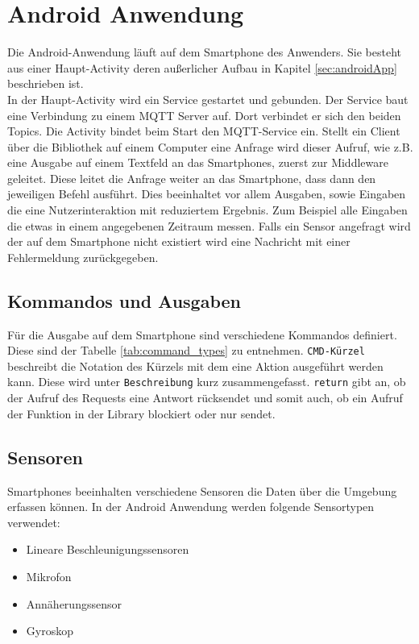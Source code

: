 \documentclass[11pt,a4paper]{report}
\begin{document}
\chapter{Android Anwendung}\label{chap:app}
Die Android-Anwendung läuft auf dem Smartphone des Anwenders.
Sie besteht aus einer Haupt-Activity deren außerlicher Aufbau in Kapitel \ref{sec:androidApp} beschrieben ist. 
\\
In der Haupt-Activity wird ein Service gestartet und gebunden.
Der Service baut eine Verbindung zu einem MQTT Server auf.
Dort verbindet er sich den beiden Topics. 
Die Activity bindet beim Start den MQTT-Service ein.
Stellt ein Client über die Bibliothek auf einem Computer eine Anfrage wird dieser Aufruf, wie z.B. eine Ausgabe auf einem Textfeld an das Smartphones,  zuerst zur Middleware geleitet.
Diese leitet die Anfrage weiter an das Smartphone, dass dann den jeweiligen Befehl ausführt.
Dies beeinhaltet vor allem Ausgaben, sowie Eingaben die eine Nutzerinteraktion mit reduziertem Ergebnis.
Zum Beispiel alle Eingaben die etwas in einem angegebenen Zeitraum messen.
Falls ein Sensor angefragt wird der auf dem Smartphone nicht existiert wird eine Nachricht mit einer Fehlermeldung zurückgegeben.


\section{Kommandos und Ausgaben}
Für die Ausgabe auf dem Smartphone sind verschiedene Kommandos definiert.
Diese sind der Tabelle \ref{tab:command_types} zu entnehmen.
\texttt{CMD-Kürzel} beschreibt die Notation des Kürzels mit dem eine Aktion ausgeführt werden kann.
Diese wird unter \texttt{Beschreibung} kurz zusammengefasst.
\texttt{return} gibt an, ob der Aufruf des Requests eine Antwort rücksendet und somit auch, ob ein Aufruf der Funktion in der Library blockiert oder nur sendet.


\section{Sensoren}
Smartphones beeinhalten verschiedene Sensoren die Daten über die Umgebung erfassen können.
In der Android Anwendung werden folgende Sensortypen verwendet:
\begin{itemize}
  \item Lineare Beschleunigungssensoren
  \item Mikrofon
  \item Annäherungssensor
  \item Gyroskop
\end{itemize}
\end{document}
